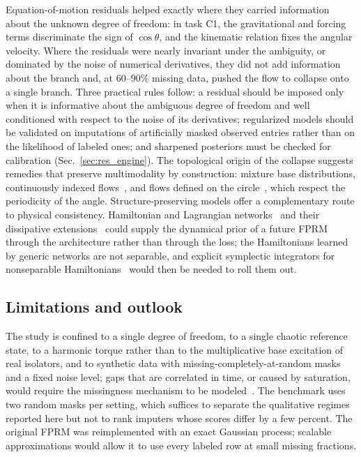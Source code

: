 Equation-of-motion residuals helped exactly where they carried information about the unknown degree of freedom: in task C1, the gravitational and forcing terms discriminate the sign of $\cos\theta$, and the kinematic relation fixes the angular velocity. Where the residuals were nearly invariant under the ambiguity, or dominated by the noise of numerical derivatives, they did not add information about the branch and, at $60$--$90\%$ missing data, pushed the flow to collapse onto a single branch. Three practical rules follow: a residual should be imposed only when it is informative about the ambiguous degree of freedom and well conditioned with respect to the noise of its derivatives; regularized models should be validated on imputations of artificially masked observed entries rather than on the likelihood of labeled ones; and sharpened posteriors must be checked for calibration (Sec.~\ref{sec:res_engine}). The topological origin of the collapse suggests remedies that preserve multimodality by construction: mixture base distributions, continuously indexed flows~\cite{Cornish2020}, and flows defined on the circle~\cite{Rezende2020}, which respect the periodicity of the angle. Structure-preserving models offer a complementary route to physical consistency. Hamiltonian and Lagrangian networks~\cite{Greydanus2019,Cranmer2020} and their dissipative extensions~\cite{Sosanya2022} could supply the dynamical prior of a future FPRM through the architecture rather than through the loss; the Hamiltonians learned by generic networks are not separable, and explicit symplectic integrators for nonseparable Hamiltonians~\cite{Tao2016} would then be needed to roll them out.

\subsection{Limitations and outlook}

The study is confined to a single degree of freedom, to a single chaotic reference state, to a harmonic torque rather than to the multiplicative base excitation of real isolators, and to synthetic data with missing-completely-at-random masks and a fixed noise level; gaps that are correlated in time, or caused by saturation, would require the missingness mechanism to be modeled~\cite{LittleRubin2019}. The benchmark uses two random masks per setting, which suffices to separate the qualitative regimes reported here but not to rank imputers whose scores differ by a few percent. The original FPRM was reimplemented with an exact Gaussian process; scalable approximations would allow it to use every labeled row at small missing fractions.

